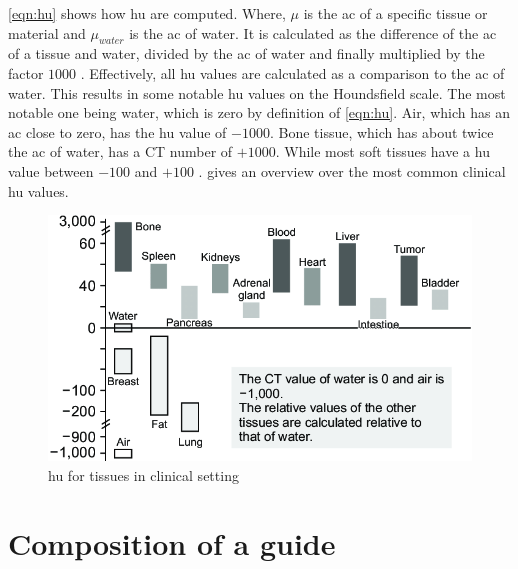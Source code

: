 \noindent
\cref{eqn:hu} shows how \acrshort{hu} are computed.
Where, $\mu$ is the \acrlong{ac} of a specific tissue or material and $\mu_{water}$
is the \acrlong{ac} of water.
It is calculated as the difference of the \acrlong{ac} of a tissue and water,
divided by the \acrshort{ac} of water and finally multiplied by the factor $1000$ \cite{liMicrocomputedTomographySmall2008}.
Effectively, all \acrshort{hu} values are calculated as a comparison to the \acrlong{ac} of water.
This results in some notable \acrshort{hu} values on the Houndsfield scale.
The most notable one being water, which is zero by definition of \cref{eqn:hu}.
Air, which has an \acrlong{ac} close to zero, has the \acrshort{hu} value of $-1000$.
Bone tissue, which has about twice the \acrlong{ac} of water, has a CT number of $+1000$.
While most soft tissues have a \acrshort{hu} value between $-100$ and $+100$ \cite{liMicrocomputedTomographySmall2008}.
 gives an overview over the most common clinical \acrshort{hu} values.
\begin{figure}[h]
	\centerline{
		\includegraphics[scale=0.5]{images/huScale.png}}
	\caption{\acrshort{hu} for tissues in clinical setting \cite{jungBasicPhysicalPrinciples2021}}\label{fig:hu-scale}
\end{figure}


\pagebreak
\section{Composition of a guide}\label{s:guide-creation}



